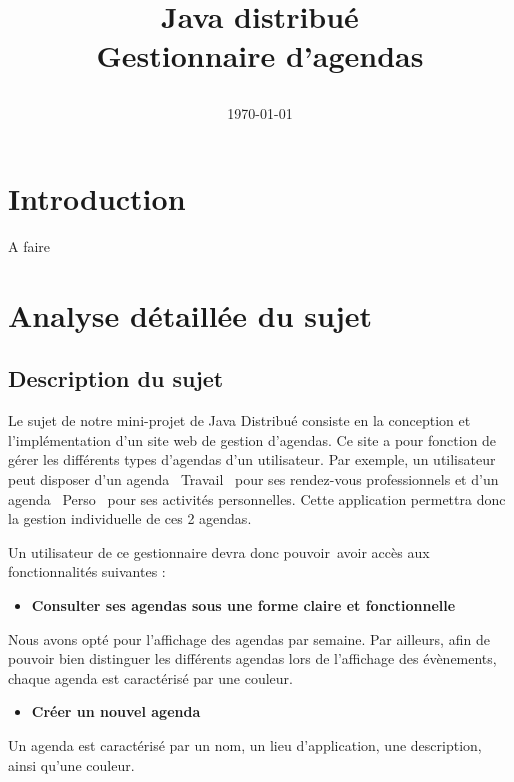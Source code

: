 \documentclass[12pt , a4paper]{article}
\title{Java distribué\\
  \vspace{0.6cm}
  \normalsize{Gestionnaire d'agendas} 
  \begin{center}
  \end{center}
}
\author{\Auteur}
\date{\today}
\begin{document}
\maketitle
\thispagestyle{empty}
\newpage
\thispagestyle{plain}%

\tableofcontents
\newpage
\section{Introduction}
\noindent A faire

\newpage
\section{Analyse détaillée du sujet}

\subsection{Description du sujet}
Le sujet de notre mini-projet de Java Distribu\'e consiste en la
conception et l{\textquoteright}impl\'ementation d{\textquoteright}un
site web de gestion d{\textquoteright}agendas. Ce site a pour fonction
de g\'erer les diff\'erents types d{\textquoteright}agendas
d{\textquoteright}un utilisateur. Par exemple, un utilisateur peut
disposer d{\textquoteright}un agenda
{\guillemotleft}~Travail~{\guillemotright} pour ses rendez-vous
professionnels et d{\textquoteright}un agenda
{\guillemotleft}~Perso~{\guillemotright} pour ses activit\'es
personnelles. Cette application permettra donc la gestion individuelle
de ces 2 agendas.


\vspace{0.5cm}

\noindent Un utilisateur de ce gestionnaire devra donc pouvoir~avoir acc\`es aux
fonctionnalit\'es suivantes :


\begin{itemize}
\item \textbf{Consulter ses agendas sous une forme claire et
    fonctionnelle}
\end{itemize}
Nous avons opt\'e pour l{\textquoteright}affichage des agendas par
semaine. Par ailleurs, afin de pouvoir bien distinguer les diff\'erents
agendas lors de l{\textquoteright}affichage des \'ev\`enements, chaque
agenda est caract\'eris\'e par une couleur.

\vspace{0.5cm}
\begin{itemize}
\item \textbf{Cr\'eer un nouvel agenda}
\end{itemize}
Un agenda est caract\'eris\'e par un nom, un lieu
d{\textquoteright}application, une description, ainsi
qu{\textquoteright}une couleur.
\end{document}

